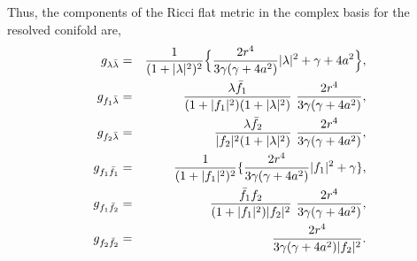 \documentclass[a4paper,12pt]{article}
\begin{document}
Thus, the components of the Ricci flat metric in the complex basis for the 
resolved conifold are,
\begin{eqnarray}
g_{\lambda {\bar{\lambda}}}&=&\frac{1}{(1+| \lambda |^2)^2}\Bigl\{
\frac{2r^4}{3\gamma(\gamma + 4a^2)}| \lambda |^2+\gamma + 4a^2 \Bigr\}, 
\nonumber \\
g_{f_1\bar{\lambda}}&=&\frac{\lambda {\bar{f}}_1}{(1+| f_1 |^2)(1+
| \lambda |^2)}\ \frac{2r^4}{3\gamma (\gamma + 4a^2)}, \nonumber \\
g_{f_2 \bar{\lambda}}&=&\frac{\lambda {\bar{f}}_2}{| f_2 |^2(1+| \lambda |^2)}
\ \frac{2r^4}{3\gamma (\gamma + 4a^2)}, \nonumber \\
g_{f_1 {\bar{f}}_1}&=&\frac{1}{(1+|f_1|^2)^2}\{ \frac{2r^4}{3\gamma(\gamma 
+ 4a^2)}|f_1 |^2 + \gamma \}, \nonumber \\
g_{f_1{\bar{f}}_2}&=&\frac{{\bar{f}}_1f_2}{(1+|f_1 |^2)| f_2 |^2}\ 
\frac{2r^4}{3\gamma(\gamma + 4a^2)}, \nonumber \\
g_{f_2 {\bar{f}}_2} &=& \frac{2r^4}{3\gamma (\gamma + 4a^2)|f_2 |^2}.
\end{eqnarray}  
 
\vspace{0.5cm}
\end{document}
